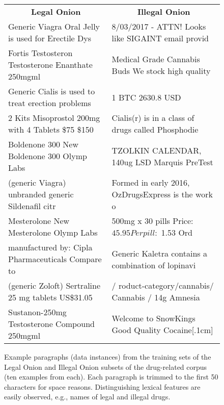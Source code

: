 \documentclass[11pt,a4paper,table]{article}
\begin{document}
\begin{figure*}[t]
\centering
\small
\begin{tabular}{l|l}
\multicolumn{1}{c}{\textbf{Legal Onion}} &
\multicolumn{1}{c}{\textbf{Illegal Onion}}\\[.1cm]
Generic Viagra Oral Jelly is used for Erectile Dys&8/03/2017 - ATTN! Looks like SIGAINT email provid\\[.1cm]
Fortis Testosteron Testosterone Enanthate 250mgml &Medical Grade Cannabis Buds We stock high quality \\[.1cm]
Generic Cialis is used to treat erection problems &1 BTC 2630.8 USD\\[.1cm]
2 Kits Misoprostol 200mg with 4 Tablets \$75 \$150&Cialis(r) is in a class of drugs called Phosphodie\\[.1cm]
Boldenone 300 New Boldenone 300 Olymp Labs&TZOLKIN CALENDAR, 140ug LSD Marquis PreTest\\[.1cm]
(generic Viagra) unbranded generic Sildenafil citr&Formed in early 2016, OzDrugsExpress is the work o\\[.1cm]
Mesterolone New Mesterolone Olymp Labs&500mg x 30 pills Price:$ 45.95 Per pill:$ 1.53 Ord\\[.1cm]
manufactured by: Cipla Pharmaceuticals Compare to &Generic Kaletra contains a combination of lopinavi\\[.1cm]
(generic Zoloft) Sertraline 25 mg tablets US\$31.05&/ roduct-category/cannabis/ Cannabis / 14g Amnesia\\[.1cm]
Sustanon-250mg Testosterone Compound 250mgml&Welcome to SnowKings Good Quality Cocaine[.1cm]
\end{tabular}
\caption{Example paragraphs (data instances) from the training sets of the Legal Onion and Illegal Onion subsets of the drug-related corpus (ten examples from each).
Each paragraph is trimmed to the first 50 characters for space reasons.
Distinguishing lexical features are easily observed, e.g.,
names of legal and illegal drugs.
\label{fig:examples}}
\end{figure*}
\end{document}
